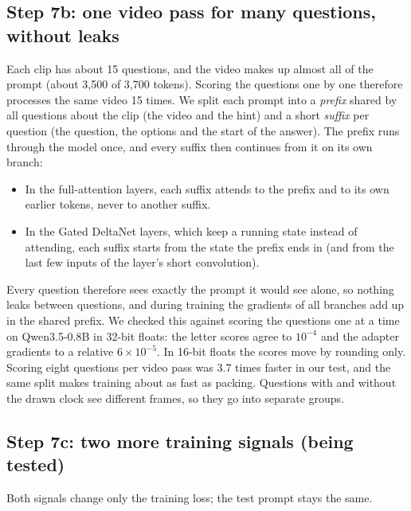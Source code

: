 \subsection{Step 7b: one video pass for many questions, without leaks}
\label{sec:branch}
Each clip has about 15 questions, and the video makes up almost all of the
prompt (about 3,500 of 3,700 tokens). Scoring the questions one by one
therefore processes the same video 15 times. We split each prompt into a
\emph{prefix} shared by all questions about the clip (the video and the hint)
and a short \emph{suffix} per question (the question, the options and the
start of the answer). The prefix runs through the model once, and every
suffix then continues from it on its own branch:
\begin{itemize}
\item In the full-attention layers, each suffix attends to the prefix and to
its own earlier tokens, never to another suffix.
\item In the Gated DeltaNet layers, which keep a running state instead of
attending, each suffix starts from the state the prefix ends in (and from
the last few inputs of the layer's short convolution).
\end{itemize}
Every question therefore sees exactly the prompt it would see alone, so
nothing leaks between questions, and during training the gradients of all
branches add up in the shared prefix. We checked this against scoring the
questions one at a time on Qwen3.5-0.8B in 32-bit floats: the letter scores
agree to $10^{-4}$ and the adapter gradients to a relative $6\times10^{-5}$.
In 16-bit floats the scores move by rounding only. Scoring eight questions
per video pass was 3.7 times faster in our test, and the same split makes
training about as fast as packing. Questions with and without the drawn clock
see different frames, so they go into separate groups.

\subsection{Step 7c: two more training signals (being tested)}
\label{sec:extra-losses}
Both signals change only the training loss; the test prompt stays the same.

